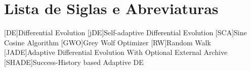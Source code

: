 \chapter*{Lista de Siglas e Abreviaturas}
\begin{acronym}

[DE]{Differential Evolution}
[jDE]{Self-adaptive Differential Evolution}
[SCA]{Sine Cosine Algorithm}
[GWO]{Grey Wolf Optimizer}
[RW]{Random Walk}
[JADE]{Adaptive Differential Evolution With Optional External Archive}
[SHADE]{Success-History based Adaptive DE}

\end{acronym}